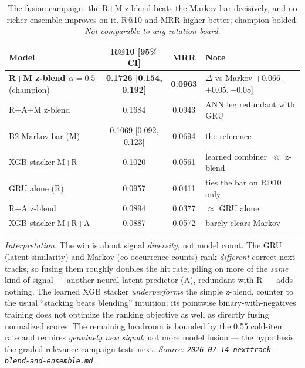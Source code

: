 \documentclass[11pt]{article}
\newcommand{\best}[1]{\textbf{#1}}
\begin{document}
\begin{table}[ht]
  \centering
  \caption{The fusion campaign: the R+M z-blend beats the Markov bar
  decisively, and no richer ensemble improves on it. R@10 and MRR
  higher-better; champion bolded. \emph{Not comparable to any rotation board.}}
  \label{tab:nexttrack-blend}
  {\small\setlength{\tabcolsep}{5pt}\begin{tabular}{lccl}
    \toprule
    Model & R@10 [95\% CI] & MRR & Note \\
    \midrule
    \best{R+M z-blend $\alpha{=}0.5$} (champion) & \best{0.1726 [0.154, 0.192]} & \best{0.0963} & $\Delta$ vs Markov $+0.066$ [$+0.05,+0.08$] \\
    R+A+M z-blend                                & 0.1684 & 0.0943 & ANN leg redundant with GRU \\
    B2 Markov bar (M)                            & 0.1069 [0.092, 0.123] & 0.0694 & the reference \\
    XGB stacker M+R                              & 0.1020 & 0.0561 & learned combiner $\ll$ z-blend \\
    GRU alone (R)                                & 0.0957 & 0.0411 & ties the bar on R@10 only \\
    R+A z-blend                                  & 0.0894 & 0.0377 & $\approx$ GRU alone \\
    XGB stacker M+R+A                            & 0.0887 & 0.0572 & barely clears Markov \\
    \bottomrule
  \end{tabular}}
\end{table}

\emph{Interpretation.} The win is about signal \emph{diversity}, not model
count. The GRU (latent similarity) and Markov (co-occurrence counts) rank
\emph{different} correct next-tracks, so fusing them roughly doubles the hit
rate; piling on more of the \emph{same} kind of signal --- another neural
latent predictor (A), redundant with R --- adds nothing. The learned XGB
stacker \emph{underperforms} the simple z-blend, counter to the usual
``stacking beats blending'' intuition: its pointwise binary-with-negatives
training does not optimize the ranking objective as well as directly fusing
normalized scores. The remaining headroom is bounded by the \num{0.55}
cold-item rate and requires \emph{genuinely new signal}, not more model fusion
--- the hypothesis the graded-relevance campaign tests next.
\emph{Source: \texttt{2026-07-14-nexttrack-blend-and-ensemble.md}.}
\end{document}
